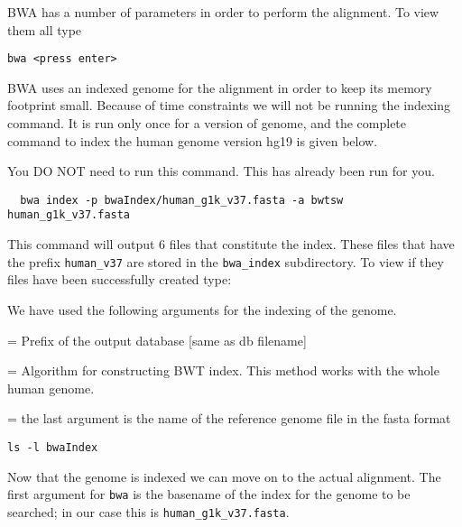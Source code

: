 \begin{steps}
BWA has a number of parameters in order to perform the alignment. To view them all type

\begin{lstlisting}
bwa <press enter> 
\end{lstlisting}

BWA uses an indexed genome for the alignment in order to keep its memory footprint small. Because of time constraints we will not be running the indexing command. It is run only once for a version of genome, and the complete command to index the human genome version hg19 is given below. 

\begin{warning}
  You DO NOT need to run this command. This has already been run for you.
  \begin{lstlisting}
  bwa index -p bwaIndex/human_g1k_v37.fasta -a bwtsw human_g1k_v37.fasta
  \end{lstlisting}
\end{warning}

This command will output 6 files that constitute the index. These files that have the prefix \texttt{human\_v37} are stored in the \texttt{bwa\_index} subdirectory. To view if they files have been successfully created type:

We have used the following arguments for the indexing of the genome.
\begin{description}[style=multiline,labelindent=0cm,align=right,leftmargin=\descriptionlabelspace,rightmargin=1.5cm,font=\ttfamily]
  \item[-p] = Prefix of the output database [same as db filename]
  \item[-a] = Algorithm for constructing BWT index. This method works with the whole human genome.
  \item[ref genome filename] = the last argument is the name of the reference genome file in the fasta format
\end{description}

\begin{lstlisting}
ls -l bwaIndex
\end{lstlisting}
\end{steps}

\begin{information}
Now that the genome is indexed we can move on to the actual alignment. The first
argument for \texttt{bwa} is the basename of the index for the genome to be searched;
in our case this is \texttt{human\_g1k\_v37.fasta}.

\end{information}


